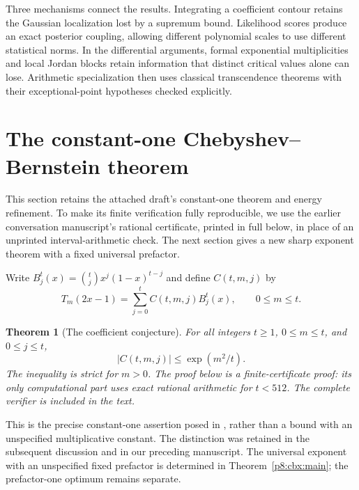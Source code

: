 \documentclass[11pt,a4paper]{article}
\newtheorem{theorem}{Theorem}[section]
\theoremstyle{definition}
\theoremstyle{remark}
\numberwithin{equation}{section}
\begin{document}
Three mechanisms connect the results. Integrating a coefficient contour
retains the Gaussian localization lost by a supremum bound. Likelihood
scores produce an exact posterior coupling, allowing different polynomial
scales to use different statistical norms. In the differential arguments,
formal exponential multiplicities and local Jordan blocks retain
information that distinct critical values alone can lose. Arithmetic
specialization then uses classical transcendence theorems with their
exceptional-point hypotheses checked explicitly.



\clearpage

\section{The constant-one Chebyshev--Bernstein theorem}
\label{p8:cba:sec}

This section retains the attached draft's constant-one theorem and energy
refinement. To make its finite verification fully reproducible, we use the
earlier conversation manuscript's rational certificate, printed in full
below, in place of an unprinted interval-arithmetic check. The next section
gives a new sharp exponent theorem with a fixed universal prefactor.

Write $B_j^t(x)=\binom tjx^j(1-x)^{t-j}$ and define $C(t,m,j)$ by
\[
 T_m(2x-1)=\sum_{j=0}^t C(t,m,j)B_j^t(x),\qquad 0\le m\le t.
\]

\begin{theorem}[The coefficient conjecture]
\label{p8:cba:constantone}
For all integers $t\ge1$, $0\le m\le t$, and $0\le j\le t$,
\begin{equation}\label{p8:cba:conjecture}
 |C(t,m,j)|\le \exp(m^2/t).
\end{equation}
The inequality is strict for $m>0$. The proof below is a finite-certificate proof: its only computational part
uses exact rational arithmetic for $t<512$. The complete verifier is
included in the text.
\end{theorem}

This is the precise constant-one assertion posed in
\cite[Supplement, Remark~4.1, equation~(23)]{p8:BT_VKVK2019}, rather than a
bound with an unspecified multiplicative constant. The distinction was
retained in the subsequent discussion \cite[Appendix~C.2]{p8:BT_MMRS2025} and
in our preceding manuscript. The universal exponent with an unspecified fixed prefactor is determined in
Theorem~\ref{p8:cbx:main}; the prefactor-one optimum remains separate.
\end{document}
